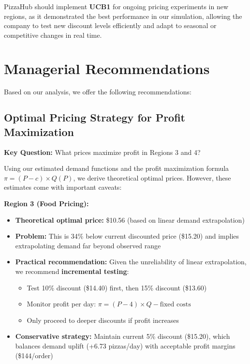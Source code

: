 \documentclass[12pt]{article}
\begin{document}
PizzaHub should implement \textbf{UCB1} for ongoing pricing experiments in new regions, as it demonstrated the best performance in our simulation, allowing the company to test new discount levels efficiently and adapt to seasonal or competitive changes in real time.

\section{Managerial Recommendations}

Based on our analysis, we offer the following recommendations:

\subsection{Optimal Pricing Strategy for Profit Maximization}

\textbf{Key Question:} What prices maximize profit in Regions 3 and 4?

Using our estimated demand functions and the profit maximization formula $\pi = (P - c) \times Q(P)$, we derive theoretical optimal prices. However, these estimates come with important caveats:

\textbf{Region 3 (Food Pricing):}
\begin{itemize}[nosep]
    \item \textbf{Theoretical optimal price:} \$10.56 (based on linear demand extrapolation)
    \item \textbf{Problem:} This is 34\% below current discounted price (\$15.20) and implies extrapolating demand far beyond observed range
    \item \textbf{Practical recommendation:} Given the unreliability of linear extrapolation, we recommend \textbf{incremental testing}:
    \begin{itemize}[nosep]
        \item Test 10\% discount (\$14.40) first, then 15\% discount (\$13.60)
        \item Monitor profit per day: $\pi = (P - 4) \times Q - \text{fixed costs}$
        \item Only proceed to deeper discounts if profit increases
    \end{itemize}
    \item \textbf{Conservative strategy:} Maintain current 5\% discount (\$15.20), which balances demand uplift (+6.73 pizzas/day) with acceptable profit margins (\$144/order)
\end{itemize}
\end{document}
